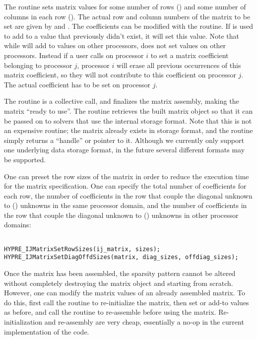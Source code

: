 The  routine sets matrix values for some number of
rows () and some number of columns in each row
().  The actual row and column numbers of the matrix
 to be set are given by  and .
The coefficients can be modified with the
 routine. If  is used to add
to a value that previously didn't exist, it will set this value.
Note that while 
will add to values on other processors,  does not set
values on other processors. Instead if a user calls 
on processor $i$ to set a matrix coefficient belonging to processor $j$, 
processor $i$ will
erase all previous occurrences of this matrix coefficient,
so they will not contribute to this coefficient on processor $j$.
The actual coefficient has to be set on processor $j$.

The  routine is a collective call, and finalizes the
matrix assembly, making the matrix ``ready to use''.  The
 routine retrieves the built matrix object so that
it can be passed on to \hypre{} solvers that use the 
internal storage format.  Note that this is not an expensive routine;
the matrix already exists in  storage format, and the
routine simply returns a ``handle'' or pointer to it.  Although we
currently only support one underlying data storage format, in the
future several different formats may be supported.

One can preset the row sizes of the matrix in order to reduce the
execution time for the matrix specification.  One can specify the
total number of coefficients for each row, the number of coefficients
in the row that couple the diagonal unknown to () unknowns
in the same processor domain, and the number of coefficients in the
row that couple the diagonal unknown to () unknowns in
other processor domains:

\begin{display}
\begin{verbatim}

HYPRE_IJMatrixSetRowSizes(ij_matrix, sizes);
HYPRE_IJMatrixSetDiagOffdSizes(matrix, diag_sizes, offdiag_sizes);

\end{verbatim}
\end{display}

Once the matrix has been assembled, the sparsity pattern cannot be
altered without completely destroying the matrix object and starting
from scratch.  However, one can modify the matrix values of an already
assembled matrix.  To do this, first call the 
routine to re-initialize the matrix, then set or add-to values as
before, and call the  routine to re-assemble before
using the matrix.  Re-initialization and re-assembly are very cheap,
essentially a no-op in the current implementation of the code.

